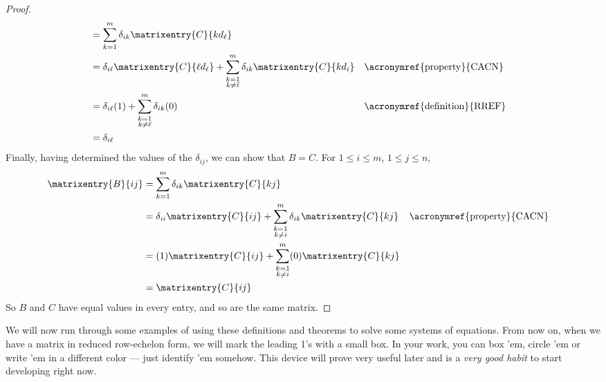 \begin{proof}
\begin{align*}
%
&=\sum_{k=1}^{m}\delta_{ik}\matrixentry{C}{kd_\ell}\\
%
%
&=
\delta_{i\ell}\matrixentry{C}{\ell d_\ell}
+
\sum_{\substack{k=1\\k\neq\ell}}^{m}\delta_{ik}\matrixentry{C}{kd_i}
&&\text{\acronymref{property}{CACN}}\\
%
&=
\delta_{i\ell}(1)
+
\sum_{\substack{k=1\\k\neq\ell}}^{m}\delta_{ik}(0)
&&\text{\acronymref{definition}{RREF}}\\
%
&=\delta_{i\ell}
%
\end{align*}
%
Finally, having determined the values of the $\delta_{ij}$, we can show that $B=C$.  For $1\leq i\leq m$, $1\leq j\leq n$,
%
\begin{align*}
\matrixentry{B}{ij}
&=\sum_{k=1}^{m}\delta_{ik}\matrixentry{C}{kj}\\
&=
\delta_{ii}\matrixentry{C}{ij}
+
\sum_{\substack{k=1\\k\neq i}}^{m}\delta_{ik}\matrixentry{C}{kj}
&&\text{\acronymref{property}{CACN}}\\
%
&=
(1)\matrixentry{C}{ij}
+
\sum_{\substack{k=1\\k\neq i}}^{m}(0)\matrixentry{C}{kj}\\
%
&=\matrixentry{C}{ij}
%
\end{align*}
%
So $B$ and $C$ have equal values in every entry, and so are the same matrix.
%
\end{proof}
%
We will now run through some examples of using these definitions and theorems to solve some systems of equations.  From now on, when we have a matrix in reduced row-echelon form, we will mark the leading 1's with a small box.  In your work, you can box 'em, circle 'em or write 'em in a different color --- just identify 'em somehow.  This device will prove very useful later and is a \emph{very good habit} to start developing right now.
%
